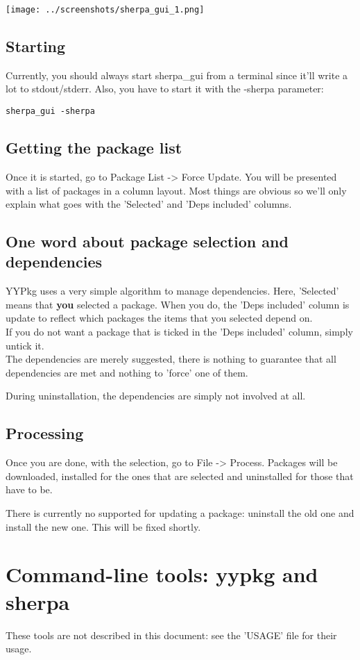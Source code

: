 \documentclass[a4paper]{article}
\begin{document}
\begin{center}
  \texttt{[image: ../screenshots/sherpa\_gui\_1.png]}
\end{center}

\subsection{Starting}
Currently, you should always start sherpa\_gui from a terminal since it'll write a lot to stdout/stderr. Also, you have to start it with the -sherpa parameter:
\begin{verbatim}
sherpa_gui -sherpa
\end{verbatim}

\subsection{Getting the package list}
Once it is started, go to Package List -> Force Update. You will be presented with a list of packages in a column layout. Most things are obvious so we'll only explain what goes with the 'Selected' and 'Deps included' columns.

\subsection{One word about package selection and dependencies}
YYPkg uses a very simple algorithm to manage dependencies.  Here, 'Selected' means that {\bf you} selected a package. When you do, the 'Deps included' column is update to reflect which packages the items that you selected depend on.\\
If you do not want a package that is ticked in the 'Deps included' column, simply untick it.\\

The dependencies are merely suggested, there is nothing to guarantee that all dependencies are met and nothing to 'force' one of them.

During uninstallation, the dependencies are simply not involved at all.

\subsection{Processing}
Once you are done, with the selection, go to File -> Process. Packages will be downloaded, installed for the ones that are selected and uninstalled for those that have to be.

There is currently no supported for updating a package: uninstall the old one and install the new one. This will be fixed shortly.

\section{Command-line tools: yypkg and sherpa}
These tools are not described in this document: see the 'USAGE' file for their usage.
\end{document}

